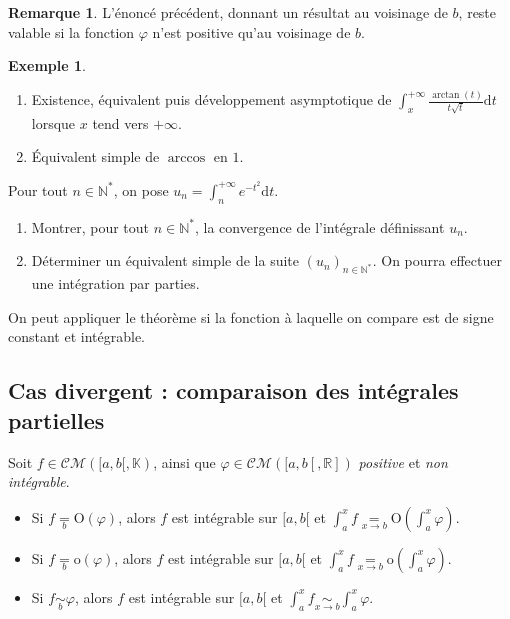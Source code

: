\documentclass[french]{article}
\newcommand{\N}{\mathbb{N}}
\newcommand{\R}{\mathbb{R}}
\newcommand{\K}{\mathbb{K}}
\newcommand{\st}{^*}
\renewcommand{\o}{\text{o}}
\renewcommand{\O}{\text{O}}
\renewcommand{\d}{\text{d}}
\theoremstyle{plain}
\theoremstyle{definition}
\newtheorem*{ex}{Exemple}
\newtheorem*{rmq}{Remarque}
\theoremstyle{remark}
\begin{document}
\begin{rmq}
	L'énoncé précédent, donnant un résultat au voisinage de $b$, reste valable si la fonction $\varphi$ n'est positive qu'au voisinage de $b$.
\end{rmq}

\begin{ex}
	\begin{enumerate}
		\item Existence, équivalent puis développement asymptotique de $\displaystyle\int_{x}^{+\infty}\frac{\arctan(t)}{t\sqrt{t}}\d t$ lorsque $x$ tend vers $+\infty$.
		\item Équivalent simple de $\arccos$ en $1$.
	\end{enumerate}
\end{ex}

\begin{exo}
	Pour tout $n\in\N\st$, on pose $u_n=\displaystyle\int_{n}^{+\infty}e^{-t^2}\d t$.
	\begin{enumerate}
		\item Montrer, pour tout $n\in\N\st$, la convergence de l'intégrale définissant $u_n$.
		\item Déterminer un équivalent simple de la suite $(u_n)_{n\in\N\st}$. On pourra effectuer une intégration par parties.
	\end{enumerate}
\end{exo}

\begin{met}
	On peut appliquer le théorème si la fonction à laquelle on compare est de signe constant et intégrable.
\end{met}

\subsection{Cas divergent : comparaison des intégrales partielles}

\begin{prop}%
	Soit $f\in\mathcal{CM}([a,b[,\K)$, ainsi que $\varphi\in\mathcal{CM}([a,b[,\R])$ \textit{positive} et \textit{non intégrable}.
	\begin{itemize}
		\item Si $f\underset{b}{=}\O(\varphi)$, alors $f$ est intégrable sur $[a,b[$ et $\displaystyle\int_{a}^{x}f\underset{x\to b}{=}\O\left(\int_{a}^{x}\varphi\right)$.
		\item Si $f\underset{b}{=}\o(\varphi)$, alors $f$ est intégrable sur $[a,b[$ et $\displaystyle\int_{a}^{x}f\underset{x\to b}{=}\o\left(\int_{a}^{x}\varphi\right)$.
		\item Si $f\underset{b}{\sim}\varphi$, alors $f$ est intégrable sur $[a,b[$ et $\displaystyle\int_{a}^{x}f\underset{x\to b}{\sim}\int_{a}^{x}\varphi$.
	\end{itemize}
\end{prop}
\end{document}
